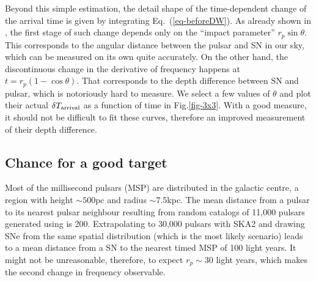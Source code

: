 \documentclass[aps,showpacs,onecolumn,floats,prd,superscriptaddress,nofootinbib]{revtex4}
\begin{document}
Beyond this simple estimation, the detail shape of the time-dependent change of the arrival time is given by integrating Eq.~(\ref{eq-beforeDW}). As already shown in \cite{OluPie13}, the first stage of such change depends only on the ``impact parameter'' $r_p\sin\theta$. This corresponds to the angular distance between the pulsar and SN in our sky, which can be measured on its own quite accurately. On the other hand, the discontinuous change in the derivative of frequency happens at $t=r_p(1-\cos\theta)$. That corresponds to the depth difference between SN and pulsar, which is notoriously hard to measure. We select a few values of $\theta$ and plot their actual $\delta T_{\rm arrival}$ as a function of time in Fig.\ref{fig-3x3}. With a good measure, it should not be difficult to fit these curves, therefore an improved measurement of their depth difference.

\subsection{Chance for a good target}

Most of the millisecond pulsars (MSP) are distributed in the galactic centre, a region with height $\sim 500$pc and radius $\sim 7.5$kpc. The mean distance from a pulsar to its nearest pulsar neighbour resulting from random catalogs of 11,000 pulsars generated using \cite{MSPpopulation} is 200.  Extrapolating to 30,000 pulsars with SKA2 \cite{SKA} and drawing SNe from the same spatial distribution (which is the most likely scenario) leads to a mean distance from a SN to the nearest timed MSP of 100 light years. It might not be unreasonable, therefore, to expect $r_p \sim30$ light years, which makes the second change in frequency observable. 

\end{document}
